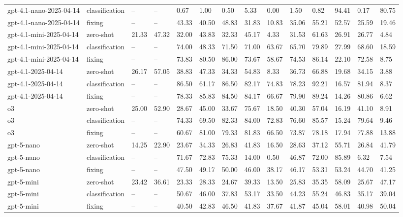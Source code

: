 \begin{table}[!t]
\begin{tabular}{llllllllllllll}
gpt-4.1-nano-2025-04-14 & classification & -- & -- & 0.67 & 1.00 & 0.50 & 5.33 & 0.00 & 1.50 & 0.82 & 94.41 & 0.17 & 80.75 \\
gpt-4.1-nano-2025-04-14 & fixing & -- & -- & 43.33 & 40.50 & 48.83 & 31.83 & 10.83 & 35.06 & 55.21 & 52.57 & 25.59 & 19.46 \\
gpt-4.1-mini-2025-04-14 & zero-shot & 21.33 & 47.32 & 32.00 & 43.83 & 32.33 & 45.17 & 4.33 & 31.53 & 61.63 & 26.91 & 26.77 & 4.84 \\
gpt-4.1-mini-2025-04-14 & classification & -- & -- & 74.00 & 48.33 & 71.50 & 71.00 & 63.67 & 65.70 & 79.89 & 27.99 & 68.60 & 18.59 \\
gpt-4.1-mini-2025-04-14 & fixing & -- & -- & 73.83 & 80.50 & 86.00 & 73.67 & 58.67 & 74.53 & 86.14 & 22.10 & 72.58 & 8.75 \\
gpt-4.1-2025-04-14 & zero-shot & 26.17 & 57.05 & 38.83 & 47.33 & 34.33 & 54.83 & 8.33 & 36.73 & 66.88 & 19.68 & 34.15 & 3.88 \\
gpt-4.1-2025-04-14 & classification & -- & -- & 86.50 & 61.17 & 86.50 & 82.17 & 74.83 & 78.23 & 92.21 & 16.57 & 81.94 & 8.37 \\
gpt-4.1-2025-04-14 & fixing & -- & -- & 78.33 & 85.83 & 84.50 & 84.17 & 66.67 & 79.90 & 89.24 & 14.26 & 80.86 & 6.62 \\
o3 & zero-shot & 25.00 & 52.90 & 28.67 & 45.00 & 33.67 & 75.67 & 18.50 & 40.30 & 57.04 & 16.19 & 41.10 & 8.91 \\
o3 & classification & -- & -- & 74.33 & 69.50 & 82.33 & 84.00 & 72.83 & 76.60 & 85.57 & 15.24 & 79.64 & 9.46 \\
o3 & fixing & -- & -- & 60.67 & 81.00 & 79.33 & 81.83 & 66.50 & 73.87 & 78.18 & 17.94 & 77.88 & 13.88 \\
gpt-5-nano & zero-shot & 14.25 & 22.90 & 23.67 & 34.33 & 26.83 & 41.83 & 16.50 & 28.63 & 37.12 & 55.71 & 26.84 & 41.79 \\
gpt-5-nano & classification & -- & -- & 71.67 & 72.83 & 75.33 & 14.00 & 0.50 & 46.87 & 72.00 & 85.89 & 6.32 & 7.54 \\
gpt-5-nano & fixing & -- & -- & 47.50 & 49.17 & 50.00 & 46.00 & 38.17 & 46.17 & 53.31 & 53.24 & 44.70 & 41.25 \\
gpt-5-mini & zero-shot & 23.42 & 36.61 & 23.33 & 28.33 & 24.67 & 39.33 & 13.50 & 25.83 & 35.35 & 58.09 & 25.67 & 47.17 \\
gpt-5-mini & classification & -- & -- & 50.67 & 46.00 & 37.83 & 53.17 & 33.50 & 44.23 & 55.24 & 46.83 & 35.17 & 39.04 \\
gpt-5-mini & fixing & -- & -- & 40.50 & 42.83 & 46.50 & 41.83 & 37.67 & 41.87 & 45.04 & 58.01 & 40.98 & 50.04 \\

\end{tabular}
\end{table}
